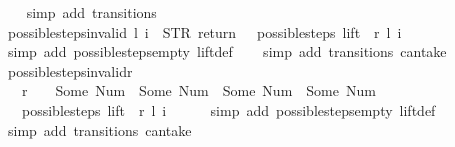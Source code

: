 \begin{isabellebody}
\ \ \isamarkupfalse%
\ {\isacharparenleft}simp\ add{\isacharcolon}\ transitions{\isacharparenright}%
\endisatagproof
{\isafoldproof}%
%
\isadelimproof
\isanewline
%
\endisadelimproof
\isanewline
{}\isamarkupfalse%
\ possible{\isacharunderscore}steps{\isacharunderscore}{}{\isacharunderscore}invalid{\isacharcolon}\ {\isachardoublequoteopen}{\isacharparenleft}l{\isacharcomma}\ i{\isacharparenright}\ {\isasymnoteq}\ {\isacharparenleft}STR\ {\isacharprime}{\isacharprime}return{\isacharprime}{\isacharprime}{\isacharcomma}\ {\isacharbrackleft}{\isacharbrackright}{\isacharparenright}\ {\isasymLongrightarrow}\ possible{\isacharunderscore}steps\ lift\ {}\ r\ l\ i\ {\isacharequal}\ {\isacharbraceleft}{\isacharbar}{\isacharbar}{\isacharbraceright}{\isachardoublequoteclose}\isanewline
%
\isadelimproof
\ \ %
\endisadelimproof
%
\isatagproof
{}\isamarkupfalse%
\ {\isacharparenleft}simp\ add{\isacharcolon}\ possible{\isacharunderscore}steps{\isacharunderscore}empty\ lift{\isacharunderscore}def{\isacharparenright}\isanewline
\ \ \isamarkupfalse%
\ {\isacharparenleft}simp\ add{\isacharcolon}\ transitions\ can{\isacharunderscore}take{\isacharparenright}%
\endisatagproof
{\isafoldproof}%
%
\isadelimproof
\isanewline
%
\endisadelimproof
\isanewline
{}\isamarkupfalse%
\ possible{\isacharunderscore}steps{\isacharunderscore}{}{\isacharunderscore}invalid{\isacharunderscore}r{}{\isacharcolon}\ \isanewline
\ \ \ {\isachardoublequoteopen}r\ {\isachardollar}\ {}\ {\isasymnotin}\ {\isacharbraceleft}Some\ {\isacharparenleft}Num\ {}{\isacharparenright}{\isacharcomma}\ Some\ {\isacharparenleft}Num\ {}{\isacharparenright}{\isacharcomma}\ Some\ {\isacharparenleft}Num\ {}{\isacharparenright}{\isacharcomma}\ Some\ {\isacharparenleft}Num\ {}{\isacharparenright}{\isacharbraceright}{\isachardoublequoteclose}\isanewline
\ \ \ {\isachardoublequoteopen}possible{\isacharunderscore}steps\ lift\ {}\ r\ l\ i\ {\isacharequal}\ {\isacharbraceleft}{\isacharbar}{\isacharbar}{\isacharbraceright}{\isachardoublequoteclose}\isanewline
%
\isadelimproof
\ \ %
\endisadelimproof
%
\isatagproof
{}\isamarkupfalse%
\ {\isacharparenleft}simp\ add{\isacharcolon}\ possible{\isacharunderscore}steps{\isacharunderscore}empty\ lift{\isacharunderscore}def{\isacharparenright}\isanewline
\ \ \isamarkupfalse%
\ {\isacharparenleft}simp\ add{\isacharcolon}\ transitions\ can{\isacharunderscore}take{\isacharparenright}\isanewline

\end{isabellebody}
